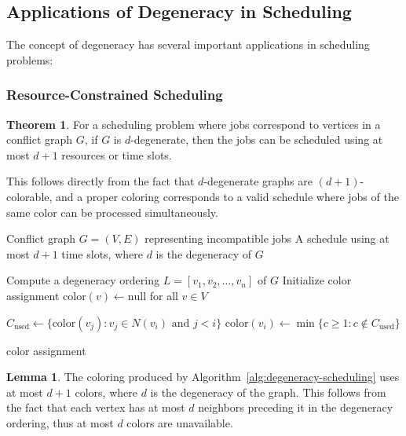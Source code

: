 \documentclass{article}
\theoremstyle{definition}
\newtheorem{theorem}{Theorem}
\newtheorem{lemma}{Lemma}
\begin{document}
\subsection*{Applications of Degeneracy in Scheduling}

The concept of degeneracy has several important applications in scheduling problems:

\subsubsection*{Resource-Constrained Scheduling}

\begin{theorem}
For a scheduling problem where jobs correspond to vertices in a conflict graph $G$, if $G$ is $d$-degenerate, then the jobs can be scheduled using at most $d+1$ resources or time slots.
\end{theorem}
This follows directly from the fact that $d$-degenerate graphs are $(d+1)$-colorable, and a proper coloring corresponds to a valid schedule where jobs of the same color can be processed simultaneously.

\begin{algorithm}
\caption{Scheduling using Degeneracy Ordering}
\label{alg:degeneracy-scheduling}
\begin{algorithmic}[1]
    \Require Conflict graph $G = (V, E)$ representing incompatible jobs
    \Ensure A schedule using at most $d+1$ time slots, where $d$ is the degeneracy of $G$
    
    \State Compute a degeneracy ordering $L = [v_1, v_2, \ldots, v_n]$ of $G$
    \State Initialize color assignment $\text{color}(v) \gets \text{null}$ for all $v \in V$
    
        \State $C_{\text{used}} \gets \{\text{color}(v_j) : v_j \in N(v_i) \text{ and } j < i\}$ 
        \State $\text{color}(v_i) \gets \min\{c \geq 1 : c \notin C_{\text{used}}\}$ 
    \EndFor
    
    \State \Return $\text{color}$ assignment
\end{algorithmic}
\end{algorithm}

\begin{lemma}
The coloring produced by Algorithm~\ref{alg:degeneracy-scheduling} uses at most $d+1$ colors, where $d$ is the degeneracy of the graph. This follows from the fact that each vertex has at most $d$ neighbors preceding it in the degeneracy ordering, thus at most $d$ colors are unavailable.
\end{lemma}
\end{document}

